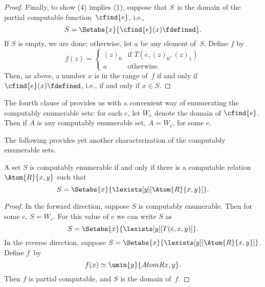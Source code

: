 \documentclass[../../../include/open-logic-section]{subfiles}
\begin{document}
\begin{proof}
Finally, to show (4) implies (1), suppose that $S$~is the domain of the
partial computable function~$\cfind{e}$, i.e.,
\[
S = \Setabs{x}{\cfind{e}(x) \fdefined}.
\]
If $S$ is empty, we are done; otherwise, let $a$ be any element
of~$S$. Define $f$ by
\[
f(z) = \begin{cases}
(z)_0 & \text{if $T(e,(z)_0,(z)_1)$} \\
a & \text{otherwise.}
\end{cases}
\]
Then, as above, a number $x$ is in the range of~$f$ if and only if
$\cfind{e}(x) \fdefined$, i.e., if and only if $x \in S$. 
\end{proof}

The fourth clause of  provides us with a
convenient way of enumerating the computably enumerable sets: for each
$e$, let $W_e$ denote the domain of $\cfind{e}$. Then if $A$ is any
computably enumerable set, $A = W_e$, for some $e$.

The following provides yet another characterization of the computably
enumerable sets.

\begin{thm}
A set $S$ is computably enumerable if and only if there is a
computable relation $\Atom{R}{x,y}$ such that
\[
S = \Setabs{ x }{ \lexists[y][\Atom{R}{x,y}] }.
\]
\end{thm}

\begin{proof}
In the forward direction, suppose $S$ is computably
enumerable. Then for some $e$, $S = W_e$. For this value of $e$
we can write $S$ as
\[
S = \Setabs{ x }{ \lexists[y][T(e, x, y)] }.
\]
In the reverse direction, suppose $S = \Setabs{ x }{
  \lexists[y][\Atom{R}{x, y}] }$. Define $f$~by
\[
f(x) \simeq \umin{y}{Atom{R}{x,y}}.
\]
Then $f$ is partial computable, and $S$ is the domain of~$f$.
\end{proof}
\end{document}
